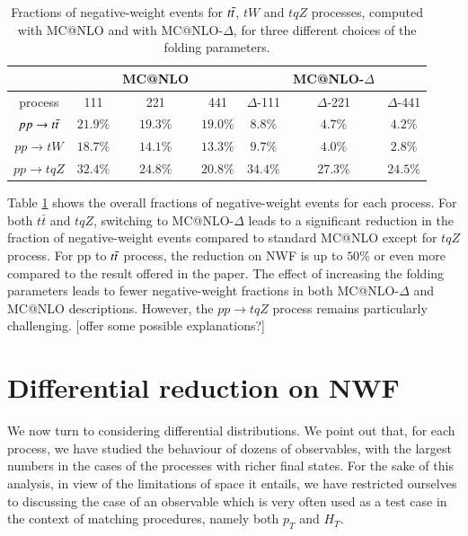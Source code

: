 \documentclass[NOTE, REPORT=true, atlasdraft=true, USenglish]{atlasdoc}
\begin{document}
\begin{table}[h!]
\centering
\begin{tabular}{||c| c c c | c c c||} 
 \hline
  & & MC@NLO & & & MC@NLO-$\Delta$ & \\ [0.5ex]
 \hline
  process & 111 & 221 & 441 & $\Delta$-111 & $\Delta$-221 & $\Delta$-441 \\ [0.5ex] 
  \hline
  $pp\rightarrow t\Bar{t}$ & $21.9\%$ & $19.3\%$ & $19.0\%$ & $8.8\%$ & $4.7\%$ & $4.2\%$ \\
  $pp\rightarrow tW$ & $18.7\%$ & $14.1\%$ & $13.3\%$ & $9.7\%$ & $4.0\%$ & $2.8\%$ \\ 
  $pp\rightarrow tqZ$ & $32.4\%$ & $24.8\%$ & $20.8\%$ & $34.4\%$ & $27.3\%$ & $24.5\%$ \\
 \hline
\end{tabular}
\caption{Fractions of negative-weight events for $t\Bar{t}$, $tW$ and $tqZ$ processes, computed with MC@NLO and with MC@NLO-$\Delta$, for three different choices of the folding parameters.}
\label{table:inclusive negative fraction}
\end{table}




Table \ref{table:inclusive negative fraction} shows the overall fractions of negative-weight events for each process. For both $t\bar{t}$ and $tqZ$, switching to MC@NLO-$\Delta$ leads to a significant reduction in the fraction of negative-weight events compared to standard MC@NLO except for $tqZ$ process. For pp to $t\Bar{t}$ process, the reduction on NWF is up to $50\%$ or even more compared to the result offered in the paper\cite{NLO_matching}. The effect of increasing the folding parameters leads to fewer negative-weight fractions in both MC@NLO-$\Delta$ and MC@NLO descriptions. However, the $pp\rightarrow tqZ$ process remains particularly challenging. [offer some possible explanations?]


\section{Differential reduction on NWF}
We now turn to considering differential distributions. We point out that, for each process, we have studied the behaviour of dozens of observables, with the largest numbers in the cases of the processes with richer final states. For the sake of this analysis, in view of the limitations of space it entails, we have restricted ourselves to discussing the case of an observable which is very often used as a test case in the context of matching procedures, namely both $p_T$ and $H_T$.
\end{document}
